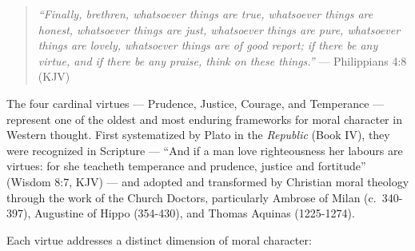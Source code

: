 \documentclass[10pt, letterpaper, twocolumn]{article}
\begin{document}
\begin{quote}
\emph{``Finally, brethren, whatsoever things are true, whatsoever things are honest, whatsoever things are just, whatsoever things are pure, whatsoever things are lovely, whatsoever things are of good report; if there be any virtue, and if there be any praise, think on these things.''} --- Philippians 4:8 (KJV)
\end{quote}

The four cardinal virtues --- Prudence, Justice, Courage, and Temperance --- represent one of the oldest and most enduring frameworks for moral character in Western thought. First systematized by Plato in the \emph{Republic} (Book IV), they were recognized in Scripture --- ``And if a man love righteousness her labours are virtues: for she teacheth temperance and prudence, justice and fortitude'' (Wisdom 8:7, KJV) --- and adopted and transformed by Christian moral theology through the work of the Church Doctors, particularly Ambrose of Milan (c.~340-397), Augustine of Hippo (354-430), and Thomas Aquinas (1225-1274).

Each virtue addresses a distinct dimension of moral character:
\end{document}
